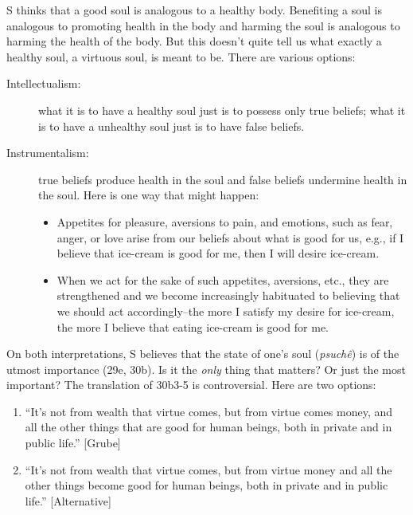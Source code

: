 \documentclass[oneside]{article}
\begin{document}
S thinks that a good soul is analogous to a healthy body. Benefiting a soul is analogous to promoting health in the body and harming the soul is analogous to harming the health of the body.  But this doesn't quite tell us what exactly a healthy soul, a virtuous soul, is meant to be. There are various options: 
\begin{description}
\item[Intellectualism:] what it is to have a healthy soul just is to possess only true beliefs; what it is to have a unhealthy soul just is to have false beliefs. 
\item[Instrumentalism:] true beliefs produce health in the soul and false beliefs undermine health in the soul. Here is one way that might happen:
\begin{itemize}
\item Appetites  for pleasure, aversions to pain, and emotions, such as fear, anger, or love arise from our beliefs about what is good for us, e.g., if I believe that ice-cream is good for me, then I will desire ice-cream. 
\item When we act for the sake of such appetites, aversions, etc., they are strengthened and we become increasingly habituated to believing that we should act accordingly--the  more I satisfy my desire for ice-cream, the more I believe that eating ice-cream is good for me.
\end{itemize}
\end{description}
On both interpretations, S believes that the state of one's soul (\emph{psuch\^{e}}) is of the utmost importance (29e, 30b). Is it the \emph{only} thing that matters? Or just the most important? The translation of 30b3-5 is controversial. Here are two options:
\begin{enumerate}
\item ``It's not from wealth that virtue comes, but from virtue comes money, and all the other things that are good for human beings, both in private and in public life.'' [Grube]
\item  ``It's not from wealth that virtue comes, but from virtue money and all the other things become good for human beings, both in private and in public life.'' [Alternative]
\end{enumerate}
\end{document}
